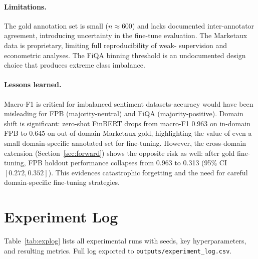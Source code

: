 \documentclass[11pt]{article}
\begin{document}
\paragraph{Limitations.}
The gold annotation set is small ($n \approx 600$) and lacks documented
inter-annotator agreement, introducing uncertainty in the fine-tune evaluation.
The Marketaux data is proprietary, limiting full reproducibility of weak-
supervision and econometric analyses. The FiQA binning threshold is an
undocumented design choice that produces extreme class imbalance.

\paragraph{Lessons learned.}
Macro-F1 is critical for imbalanced sentiment datasets-accuracy would
have been misleading for FPB (majority-neutral) and FiQA (majority-positive).
Domain shift is significant: zero-shot FinBERT drops from macro-F1 0.963
on in-domain FPB to 0.645 on out-of-domain Marketaux gold, highlighting the
value of even a small domain-specific annotated set for fine-tuning.
However, the cross-domain extension (Section~\ref{sec:forward}) shows the
opposite risk as well: after gold fine-tuning, FPB holdout performance
collapses from 0.963 to 0.313 (95\% CI $[0.272, 0.352]$). This evidences
catastrophic forgetting and the need for careful domain-specific fine-tuning
strategies.




\appendix

\section{Experiment Log}
\label{app:log}

Table~\ref{tab:explog} lists all experimental runs with seeds, key
hyperparameters, and resulting metrics. Full log exported to
\texttt{outputs/experiment\_log.csv}.
\end{document}
